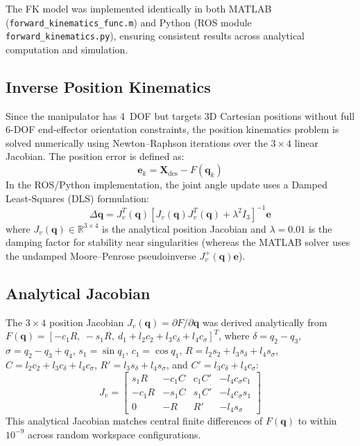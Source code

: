 \documentclass[conference]{IEEEtran}
\begin{document}
The FK model was implemented identically in both MATLAB (\texttt{forward\_kinematics\_func.m}) and Python (ROS module \texttt{forward\_kinematics.py}), ensuring consistent results across analytical computation and simulation.

\subsection{Inverse Position Kinematics}

Since the manipulator has 4~DOF but targets 3D Cartesian positions without full 6-DOF end-effector orientation constraints, the position kinematics problem is solved numerically using Newton--Raphson iterations over the $3 \times 4$ linear Jacobian. The position error is defined as:
\begin{equation}
\mathbf{e}_k = \mathbf{X}_{\text{des}} - F(\mathbf{q}_k)
\label{eq:ik_error}
\end{equation}
In the ROS/Python implementation, the joint angle update uses a Damped Least-Squares (DLS) formulation:
\begin{equation}
\Delta\mathbf{q} = J_v^T(\mathbf{q}) \left[ J_v(\mathbf{q}) J_v^T(\mathbf{q}) + \lambda^2 I_3 \right]^{-1} \mathbf{e}
\label{eq:dls}
\end{equation}
where $J_v(\mathbf{q}) \in \mathbb{R}^{3 \times 4}$ is the analytical position Jacobian and $\lambda = 0.01$ is the damping factor for stability near singularities (whereas the MATLAB solver uses the undamped Moore--Penrose pseudoinverse $J_v^+(\mathbf{q})\mathbf{e}$).

\subsection{Analytical Jacobian}

The $3 \times 4$ position Jacobian $J_v(\mathbf{q}) = \partial F / \partial \mathbf{q}$ was derived analytically from $F(\mathbf{q}) = [-c_1 R,\ -s_1 R,\ d_1 + l_2 c_2 + l_3 c_\delta + l_4 c_\sigma]^T$, where $\delta = q_2 - q_3$, $\sigma = q_2 - q_3 + q_4$, $s_1 = \sin q_1$, $c_1 = \cos q_1$, $R = l_2 s_2 + l_3 s_\delta + l_4 s_\sigma$, $C = l_2 c_2 + l_3 c_\delta + l_4 c_\sigma$, $R' = l_3 s_\delta + l_4 s_\sigma$, and $C' = l_3 c_\delta + l_4 c_\sigma$:
\begin{equation}
J_v = \begin{bmatrix}
s_1 R & -c_1 C & c_1 C' & -l_4 c_\sigma c_1 \\
-c_1 R & -s_1 C & s_1 C' & -l_4 c_\sigma s_1 \\
0 & -R & R' & -l_4 s_\sigma
\end{bmatrix}
\label{eq:jacobian}
\end{equation}
This analytical Jacobian matches central finite differences of $F(\mathbf{q})$ to within $10^{-9}$ across random workspace configurations.
\end{document}
